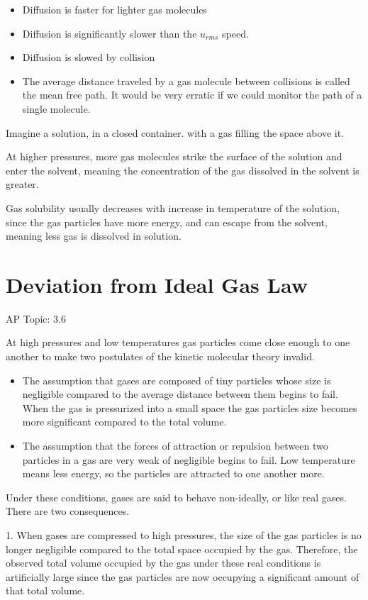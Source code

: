 \documentclass[../chem.tex]{subfiles}
\begin{document}
\begin{itemize}
    \item Diffusion is faster for lighter gas molecules 
    \item Diffusion is significantly slower than the $u_{rms}$ speed. 
    \item Diffusion is slowed by collision 
    \item The average distance traveled by a gas molecule between collisions is called the mean free path. It would be very erratic if we could monitor the path of a single molecule.
\end{itemize}

Imagine a solution, in a closed container. with a gas filling the space above it.

At higher pressures, more gas molecules strike the surface of the solution and enter the solvent, meaning the concentration of the gas dissolved in the solvent is greater.

Gas solubility usually decreases with increase in temperature of the solution, since the gas particles have more energy, and can escape from the solvent, meaning less gas is dissolved in solution.
\section{Deviation from Ideal Gas Law}
AP Topic: 3.6

At high pressures and low temperatures gas particles come close enough to one another to make two postulates of the kinetic molecular theory invalid.
\begin{itemize}
    \item The assumption that gases are composed of tiny particles whose size is negligible compared to the average distance between them begins to fail. When the gas is pressurized into a small space the gas particles size becomes more significant compared to the total volume.
    \item The assumption that the forces of attraction or repulsion between two particles in a gas are very weak of negligible begins to fail. Low temperature means less energy, so the particles are attracted to one another more.
\end{itemize} 

Under these conditions, gases are said to behave non-ideally, or like real gases. There are two consequences.

1. When gases are compressed to high pressures, the size of the gas particles is no longer negligible compared to the total space occupied by the gas. Therefore, the observed total volume occupied by the gas 
under these real conditions is artificially large since the gas particles are now occupying a significant amount of that total volume.
\end{document}
